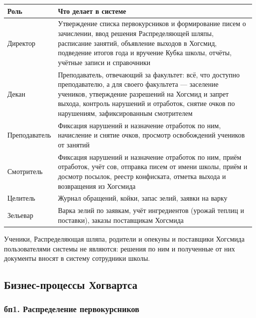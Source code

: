 \documentclass[a4paper,12pt]{article}
\begin{document}
\begin{longtable}{|>{\raggedright\arraybackslash}p{42mm}|>{\raggedright\arraybackslash}p{112mm}|}
\hline
\rowcolor{black!8}\textbf{Роль} & \textbf{Что делает в системе} \\ \hline
\endhead
Директор & Утверждение списка первокурсников и формирование писем о зачислении, ввод решения Распределяющей шляпы, расписание занятий, объявление выходов в Хогсмид, подведение итогов года и вручение Кубка школы, отчёты, учётные записи и справочники \\ \hline
Декан & Преподаватель, отвечающий за факультет: всё, что доступно преподавателю, а для своего факультета — заселение учеников, утверждение разрешений на Хогсмид и запрет выхода, контроль нарушений и отработок, снятие очков по нарушениям, зафиксированным смотрителем \\ \hline
Преподаватель & Фиксация нарушений и назначение отработок по ним, начисление и снятие очков, просмотр освобождений учеников от занятий \\ \hline
Смотритель & Фиксация нарушений и назначение отработок по ним, приём отработок, учёт сов, отправка писем от имени школы, приём и досмотр посылок, реестр конфиската, отметка выхода и возвращения из Хогсмида \\ \hline
Целитель & Журнал обращений, койки, запас зелий, заявки на варку \\ \hline
Зельевар & Варка зелий по заявкам, учёт ингредиентов (урожай теплиц и поставки), заказы поставщикам Хогсмида \\ \hline
\end{longtable}
 
Ученики, Распределяющая шляпа, родители и опекуны и поставщики Хогсмида
пользователями системы не являются: решения по ним и полученные от них документы
вносят в систему сотрудники школы.
 
\subsection{Бизнес-процессы Хогвартса}
 
 
 
\subsubsection*{бп1. Распределение первокурсников}
 
\end{document}

